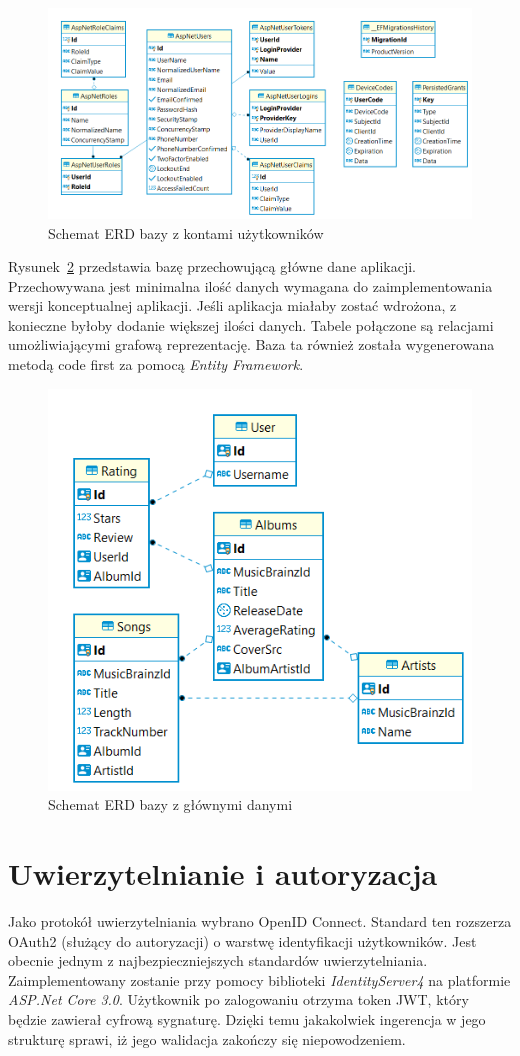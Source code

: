 	\begin{figure}[ht]
		\centering
			\includegraphics[width=\linewidth]{rys03/erdAuth.png}
		 \caption{Schemat ERD bazy z kontami użytkowników}
		 \label{fig:erdAuth}
	\end{figure}
	
	Rysunek~\ref{fig:erdRe} przedstawia bazę przechowującą główne dane aplikacji.
	Przechowywana jest minimalna ilość danych wymagana do zaimplementowania wersji konceptualnej aplikacji.
	Jeśli aplikacja miałaby zostać wdrożona, z konieczne byłoby dodanie większej ilości danych.
	Tabele połączone są relacjami umożliwiającymi grafową reprezentację.
	Baza ta również została wygenerowana metodą code first za pomocą \emph{Entity Framework}.

	\begin{figure}[ht]
		\centering
			\includegraphics[width=0.5\linewidth]{rys03/erdRe.png}
		 \caption{Schemat ERD bazy z głównymi danymi}
		 \label{fig:erdRe}
	\end{figure}

\section{Uwierzytelnianie i autoryzacja}
	Jako protokół uwierzytelniania wybrano OpenID Connect.
	Standard ten rozszerza OAuth2 (służący do autoryzacji) o warstwę identyfikacji użytkowników.
	Jest obecnie jednym z najbezpieczniejszych standardów uwierzytelniania.
	Zaimplementowany zostanie przy pomocy biblioteki \emph{IdentityServer4} na platformie \emph{ASP.Net Core 3.0}.
	Użytkownik po zalogowaniu otrzyma token JWT, który będzie zawierał cyfrową sygnaturę.
	Dzięki temu jakakolwiek ingerencja w jego strukturę sprawi, iż jego walidacja zakończy się niepowodzeniem.

